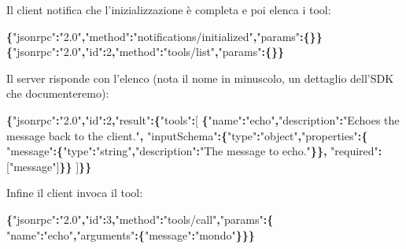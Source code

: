 \documentclass[
  italian,
  10pt,
]{book}
\newenvironment{Shaded}{\begin{snugshade}}{\end{snugshade}}
\newcommand{\DataTypeTok}[1]{\textcolor[rgb]{0.13,0.29,0.53}{#1}}
\newcommand{\DecValTok}[1]{\textcolor[rgb]{0.00,0.00,0.81}{#1}}
\newcommand{\FunctionTok}[1]{\textcolor[rgb]{0.13,0.29,0.53}{\textbf{#1}}}
\newcommand{\OtherTok}[1]{\textcolor[rgb]{0.56,0.35,0.01}{#1}}
\newcommand{\StringTok}[1]{\textcolor[rgb]{0.31,0.60,0.02}{#1}}
\begin{document}
Il client notifica che l'inizializzazione è completa e poi elenca i
tool:

\begin{Shaded}
\begin{Highlighting}[]
\FunctionTok{\{}\DataTypeTok{"jsonrpc"}\FunctionTok{:}\StringTok{"2.0"}\FunctionTok{,}\DataTypeTok{"method"}\FunctionTok{:}\StringTok{"notifications/initialized"}\FunctionTok{,}\DataTypeTok{"params"}\FunctionTok{:\{\}\}}
\FunctionTok{\{}\DataTypeTok{"jsonrpc"}\FunctionTok{:}\StringTok{"2.0"}\FunctionTok{,}\DataTypeTok{"id"}\FunctionTok{:}\DecValTok{2}\FunctionTok{,}\DataTypeTok{"method"}\FunctionTok{:}\StringTok{"tools/list"}\FunctionTok{,}\DataTypeTok{"params"}\FunctionTok{:\{\}\}}
\end{Highlighting}
\end{Shaded}

Il server risponde con l'elenco (nota il nome in minuscolo, un dettaglio
dell'SDK che documenteremo):

\begin{Shaded}
\begin{Highlighting}[]
\FunctionTok{\{}\DataTypeTok{"jsonrpc"}\FunctionTok{:}\StringTok{"2.0"}\FunctionTok{,}\DataTypeTok{"id"}\FunctionTok{:}\DecValTok{2}\FunctionTok{,}\DataTypeTok{"result"}\FunctionTok{:\{}\DataTypeTok{"tools"}\FunctionTok{:}\OtherTok{[}
  \FunctionTok{\{}\DataTypeTok{"name"}\FunctionTok{:}\StringTok{"echo"}\FunctionTok{,}\DataTypeTok{"description"}\FunctionTok{:}\StringTok{"Echoes the message back to the client."}\FunctionTok{,}
   \DataTypeTok{"inputSchema"}\FunctionTok{:\{}\DataTypeTok{"type"}\FunctionTok{:}\StringTok{"object"}\FunctionTok{,}\DataTypeTok{"properties"}\FunctionTok{:\{}
      \DataTypeTok{"message"}\FunctionTok{:\{}\DataTypeTok{"type"}\FunctionTok{:}\StringTok{"string"}\FunctionTok{,}\DataTypeTok{"description"}\FunctionTok{:}\StringTok{"The message to echo."}\FunctionTok{\}\},}
    \DataTypeTok{"required"}\FunctionTok{:}\OtherTok{[}\StringTok{"message"}\OtherTok{]}\FunctionTok{\}\}}
\OtherTok{]}\FunctionTok{\}\}}
\end{Highlighting}
\end{Shaded}

Infine il client invoca il tool:

\begin{Shaded}
\begin{Highlighting}[]
\FunctionTok{\{}\DataTypeTok{"jsonrpc"}\FunctionTok{:}\StringTok{"2.0"}\FunctionTok{,}\DataTypeTok{"id"}\FunctionTok{:}\DecValTok{3}\FunctionTok{,}\DataTypeTok{"method"}\FunctionTok{:}\StringTok{"tools/call"}\FunctionTok{,}\DataTypeTok{"params"}\FunctionTok{:\{}
  \DataTypeTok{"name"}\FunctionTok{:}\StringTok{"echo"}\FunctionTok{,}\DataTypeTok{"arguments"}\FunctionTok{:\{}\DataTypeTok{"message"}\FunctionTok{:}\StringTok{"mondo"}\FunctionTok{\}\}\}}
\end{Highlighting}
\end{Shaded}
\end{document}
